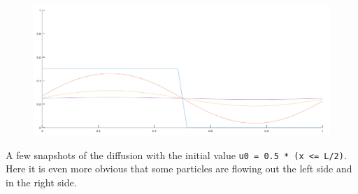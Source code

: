 \documentclass[14pt]{beamer}
\begin{document}
\begin{frame}
    \begin{figure}
        \centering
        \includegraphics[width=\textwidth]{diff2}
    \end{figure}
    \tiny
    A few snapshots of the diffusion with the initial value
    \texttt{u0 = 0.5 * (x <= L/2)}. Here it is even more obvious that some
    particles are flowing out the left side and in the right side.
\end{frame}
\end{document}
